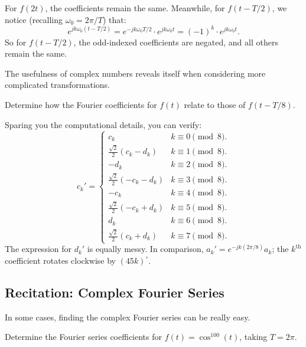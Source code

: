 \begin{solution}
    For $f(2t)$, the coefficients remain the same.
    Meanwhile, for $f(t - T/2)$, we notice (recalling $\omega_0 = 2\pi / T$) that:
    \[ e^{j k \omega_0 (t - T/2)} = e^{-j k \omega_0 T/2} \cdot e^{j k \omega_0 t}
    = (-1)^k \cdot e^{j k \omega_0 t}. \]
    So for $f(t - T/2)$, the odd-indexed coefficients are negated, and all others remain the same.
\end{solution}

The usefulness of complex numbers reveals itself when considering more complicated transformations.

\begin{problem}
    Determine how the Fourier coefficients for $f(t)$ relate to those of $f(t - T/8)$.
\end{problem}

\begin{solution}
    Sparing you the computational details, you can verify:
    \[
    c_k' = \begin{cases}
    c_k & k \equiv 0 \pmod{8}. \\
    \frac{\sqrt{2}}{2}(c_k - d_k) & k \equiv 1 \pmod{8}. \\
    -d_k & k \equiv 2 \pmod{8}. \\
    \frac{\sqrt{2}}{2}(-c_k - d_k) & k \equiv 3 \pmod{8}. \\
    -c_k & k \equiv 4 \pmod{8}. \\
    \frac{\sqrt{2}}{2}(-c_k + d_k) & k \equiv 5 \pmod{8}. \\
    d_k & k \equiv 6 \pmod{8}. \\
    \frac{\sqrt{2}}{2}(c_k + d_k) & k \equiv 7 \pmod{8}.
    \end{cases}
    \]
    The expression for $d_k'$ is equally messy.  In comparison, $a_k' = e^{-j k(2\pi / 8)} a_k$;
    the $k^{\text{th}}$ coefficient rotates clockwise by $(45k)^{\circ}$.
\end{solution}

\subsection{Recitation: Complex Fourier Series}

In some cases, finding the complex Fourier series can be really easy.

\begin{problem}
    Determine the Fourier series coefficients for $f(t) = \cos^{100}(t)$, taking $T = 2\pi$.
\end{problem}

